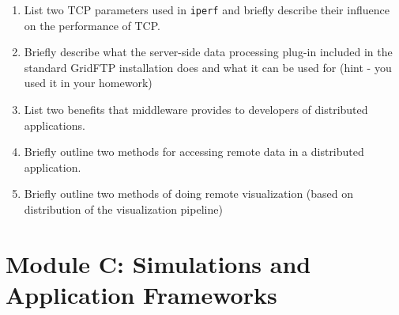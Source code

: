\documentclass[oneside]{article}
\newcommand{\answerspace}{\vskip 6.5cm}
\begin{document}
\begin{enumerate}

\item List two TCP parameters used in {\tt iperf} and briefly 
describe their influence on the performance of TCP.

\answerspace

\item Briefly describe what the server-side data processing
plug-in included in the standard GridFTP 
installation does and what it can be used for 
(hint - you used it in your homework)

\answerspace

\item List two benefits that middleware
provides to developers of distributed applications.

\answerspace

\item Briefly outline two methods for accessing remote data in
a distributed application.

\answerspace

\item Briefly outline two methods of doing remote visualization
(based on distribution of the visualization pipeline)

\end{enumerate}

\newpage

\section*{\center Module C: Simulations and Application Frameworks}
\end{document}

